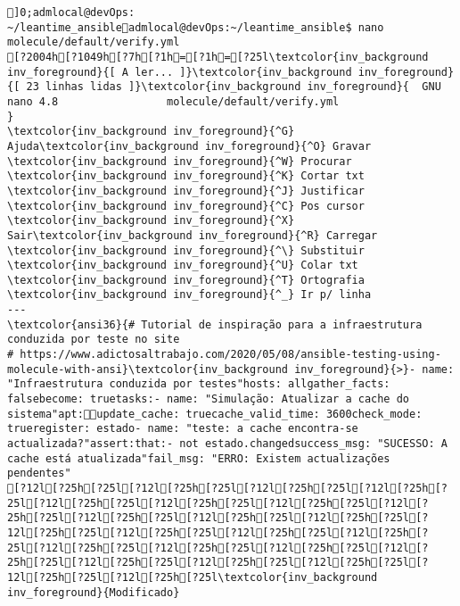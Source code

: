 \documentclass{scrartcl}
\title{}
\begin{document}
\begin{Verbatim}
]0;admlocal@devOps: ~/leantime_ansibleadmlocal@devOps:~/leantime_ansible$ nano molecule/default/verify.yml 
[?2004h[?1049h[?7h[?1h=[?1h=[?25l\textcolor{inv_background inv_foreground}{[ A ler... ]}\textcolor{inv_background inv_foreground}{[ 23 linhas lidas ]}\textcolor{inv_background inv_foreground}{  GNU nano 4.8                 molecule/default/verify.yml                             }
\textcolor{inv_background inv_foreground}{^G} Ajuda\textcolor{inv_background inv_foreground}{^O} Gravar     \textcolor{inv_background inv_foreground}{^W} Procurar   \textcolor{inv_background inv_foreground}{^K} Cortar txt \textcolor{inv_background inv_foreground}{^J} Justificar \textcolor{inv_background inv_foreground}{^C} Pos cursor
\textcolor{inv_background inv_foreground}{^X} Sair\textcolor{inv_background inv_foreground}{^R} Carregar   \textcolor{inv_background inv_foreground}{^\} Substituir \textcolor{inv_background inv_foreground}{^U} Colar txt  \textcolor{inv_background inv_foreground}{^T} Ortografia \textcolor{inv_background inv_foreground}{^_} Ir p/ linha
---
\textcolor{ansi36}{# Tutorial de inspiração para a infraestrutura conduzida por teste no site
# https://www.adictosaltrabajo.com/2020/05/08/ansible-testing-using-molecule-with-ansi}\textcolor{inv_background inv_foreground}{>}- name: "Infraestrutura conduzida por testes"hosts: allgather_facts: falsebecome: truetasks:- name: "Simulação: Atualizar a cache do sistema"apt:update_cache: truecache_valid_time: 3600check_mode: trueregister: estado- name: "teste: a cache encontra-se actualizada?"assert:that:- not estado.changedsuccess_msg: "SUCESSO: A cache está atualizada"fail_msg: "ERRO: Existem actualizações pendentes"
[?12l[?25h[?25l[?12l[?25h[?25l[?12l[?25h[?25l[?12l[?25h[?25l[?12l[?25h[?25l[?12l[?25h[?25l[?12l[?25h[?25l[?12l[?25h[?25l[?12l[?25h[?25l[?12l[?25h[?25l[?12l[?25h[?25l[?12l[?25h[?25l[?12l[?25h[?25l[?12l[?25h[?25l[?12l[?25h[?25l[?12l[?25h[?25l[?12l[?25h[?25l[?12l[?25h[?25l[?12l[?25h[?25l[?12l[?25h[?25l[?12l[?25h[?25l[?12l[?25h[?25l[?12l[?25h[?25l[?12l[?25h[?25l\textcolor{inv_background inv_foreground}{Modificado}

\end{Verbatim}
\end{document}
